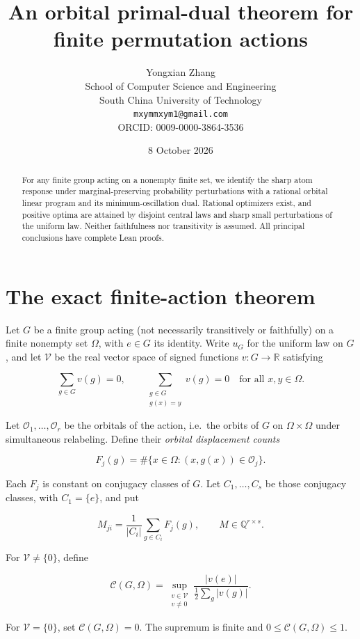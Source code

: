 \documentclass[11pt]{article}
\title{An orbital primal-dual theorem for finite permutation actions}
\author{Yongxian Zhang\\[2pt]\small School of Computer Science and Engineering\\\small South China University of Technology\\\small\texttt{mxymmxym1@gmail.com}\\\small ORCID: 0009-0000-3864-3536}
\date{8 October 2026}
\begin{document}
\maketitle
\begin{abstract}For any finite group acting on a nonempty finite set, we identify the sharp atom response under marginal-preserving probability perturbations with a rational orbital linear program and its minimum-oscillation dual. Rational optimizers exist, and positive optima are attained by disjoint central laws and sharp small perturbations of the uniform law. Neither faithfulness nor transitivity is assumed. All principal conclusions have complete Lean proofs.\end{abstract}
\section{The exact finite-action
theorem}\label{the-exact-finite-action-theorem}

Let \(G\) be a finite group acting (not necessarily transitively or
faithfully) on a finite nonempty set \(\Omega\), with \(e\in G\) its
identity. Write \(u_G\) for the uniform law on \(G\), and let
\(\mathcal V\) be the real vector space of signed functions
\(v:G\to\mathbb R\) satisfying

\[
\sum_{g\in G}v(g)=0,\qquad
\sum_{\substack{g\in G\\g(x)=y}}v(g)=0
\quad\text{for all }x,y\in\Omega. \tag{1}
\]

Let \(\mathcal O_1,\ldots,\mathcal O_r\) be the orbitals of the action,
i.e.~the orbits of \(G\) on \(\Omega\times\Omega\) under simultaneous
relabeling. Define their \emph{orbital displacement counts}

\[
F_j(g)=\#\{x\in\Omega:(x,g(x))\in\mathcal O_j\}. \tag{2}
\]

Each \(F_j\) is constant on conjugacy classes of \(G\). Let
\(C_1,\ldots,C_s\) be those conjugacy classes, with \(C_1=\{e\}\), and
put

\[
M_{ji}=\frac1{|C_i|}\sum_{g\in C_i}F_j(g),\qquad
M\in\mathbb Q^{r\times s}. \tag{3}
\]

For \(\mathcal V\ne\{0\}\), define

\[
\mathcal C(G,\Omega)=\sup_{\substack{v\in\mathcal V\\v\ne0}}
\frac{|v(e)|}{\tfrac12\sum_g|v(g)|}. \tag{4}
\]

For \(\mathcal V=\{0\}\), set \(\mathcal C(G,\Omega)=0\). The supremum
is finite and \(0\le\mathcal C(G,\Omega)\le1\).
\end{document}
